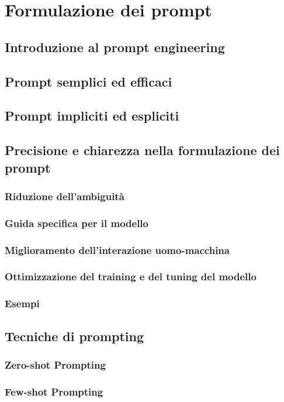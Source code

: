 \section{Formulazione dei prompt}
    \subsection{Introduzione al prompt engineering}
    \subsection{Prompt semplici ed efficaci}
    \subsection{Prompt impliciti ed espliciti}
    \subsection{Precisione e chiarezza nella formulazione dei prompt}
        \subsubsection{Riduzione dell’ambiguità}
        \subsubsection{Guida specifica per il modello}
        \subsubsection{Miglioramento dell’interazione uomo-macchina}
        \subsubsection{Ottimizzazione del training e del tuning del modello}
        \subsubsection{Esempi}
    \subsection{Tecniche di prompting}
        \subsubsection{Zero-shot Prompting}
        \subsubsection{Few-shot Prompting}
